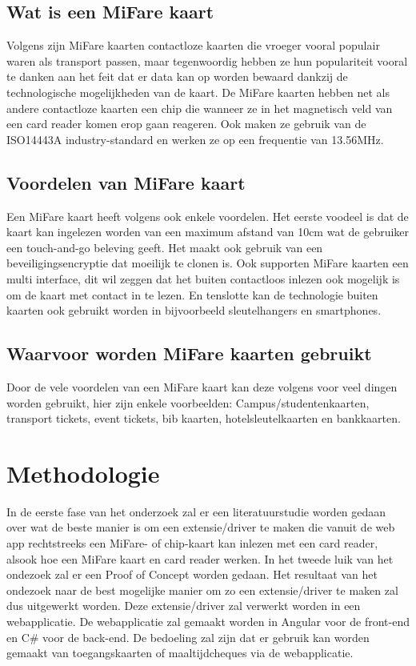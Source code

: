 \documentclass{hogent-article}
\begin{document}
\subsection{Wat is een MiFare kaart}
Volgens \textcite{Digitalid} zijn MiFare kaarten contactloze kaarten die vroeger vooral populair waren als transport passen, maar tegenwoordig hebben ze hun populariteit vooral te danken aan het feit dat er data kan op worden bewaard dankzij de technologische mogelijkheden van de kaart.
De MiFare kaarten hebben net als andere contactloze kaarten een chip die wanneer ze in het magnetisch veld van een card reader komen erop gaan reageren. Ook maken ze gebruik van de ISO14443A industry-standard en werken ze op een frequentie van 13.56MHz.

\subsection{Voordelen van MiFare kaart}
Een MiFare kaart heeft volgens \textcite{Printplast} ook enkele voordelen. Het eerste voodeel is dat de kaart kan ingelezen worden van een maximum afstand van 10cm wat de gebruiker een touch-and-go beleving geeft.
Het maakt ook gebruik van een beveiligingsencryptie dat moeilijk te clonen is. Ook supporten MiFare kaarten een multi interface, dit wil zeggen dat het buiten contactloos inlezen ook mogelijk is om de kaart met contact in te lezen. En tenslotte kan de technologie buiten kaarten ook gebruikt worden in bijvoorbeeld sleutelhangers en smartphones.

\subsection{Waarvoor worden MiFare kaarten gebruikt}
Door de vele voordelen van een MiFare kaart kan deze volgens \textcite{Digitalid} voor veel dingen worden gebruikt, hier zijn enkele voorbeelden: Campus/studentenkaarten, transport tickets, event tickets, bib kaarten, hotelsleutelkaarten en bankkaarten.

\section{Methodologie}
In de eerste fase van het onderzoek zal er een literatuurstudie worden gedaan over wat de beste manier is om een extensie/driver te maken die vanuit de web app rechtstreeks een MiFare- of chip-kaart kan inlezen met een card reader, alsook hoe een MiFare kaart en card reader werken. In het tweede luik van het ondezoek zal er een Proof of Concept worden gedaan. Het resultaat van het ondezoek naar de best mogelijke manier om zo een extensie/driver te maken zal dus uitgewerkt worden. Deze extensie/driver zal verwerkt worden in een webapplicatie. De webapplicatie zal gemaakt worden in Angular voor de front-end en C\# voor de back-end. De bedoeling zal zijn dat er gebruik kan worden gemaakt van toegangskaarten of maaltijdcheques via de webapplicatie.
\end{document}
